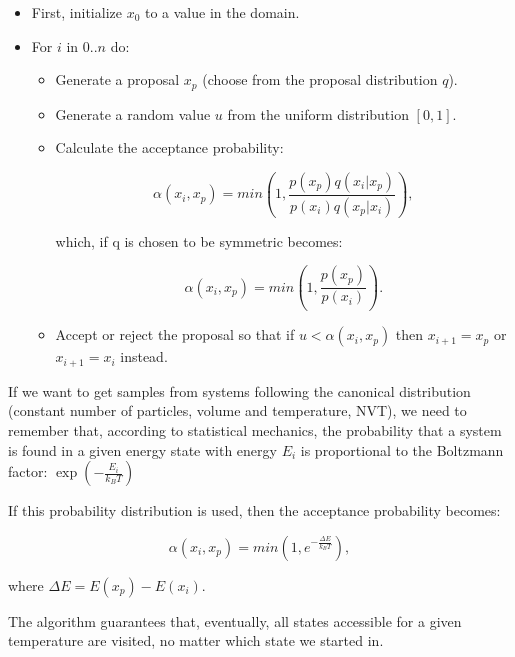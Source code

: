 \begin{itemize}
\item First, initialize $x_0$ to a value in the domain.
\item For $i$ in $0..n$  do:
\begin{itemize}
\item Generate a proposal $x_p$ (choose from the proposal distribution $q$).

\item Generate a random value $u$ from the uniform distribution $[0,1]$.

\item Calculate the acceptance probability:

\begin{equation}
\alpha (x_i,x_p) = min \left ( 1, \frac{p(x_p) q(x_i | x_p)}{p(x_i) q(x_p | x_i)} \right ) ,
\end{equation}

which, if q is chosen to be symmetric becomes:

\begin{equation}
\alpha (x_i,x_p) = min \left ( 1, \frac{p(x_p) }{p(x_i) } \right ).
\end{equation}

\item Accept or reject the proposal so that if $u < \alpha (x_i,x_p)$ then $x_{i+1} = x_p$ or $x_{i+1} = x_i$ instead.
\end{itemize}
\end{itemize}
If we want to get samples from systems following the canonical distribution (constant number of particles, volume and temperature, NVT), we need to remember that, according to statistical mechanics, the probability that a system is found in a given energy state with energy $E_i$ is proportional to the Boltzmann factor: $\exp(-\frac{E_i}{k_B T})$

If this probability distribution is used, then the acceptance probability becomes:

\begin{equation}
\alpha (x_i,x_p) = min \left ( 1,  e^{- \frac{\Delta E}{k_B T}} \right ) ,
\end{equation}

where $\Delta E = E(x_p)-E(x_i) $.

The algorithm guarantees that, eventually, all states accessible for a given temperature are visited, no matter which state we started in.

